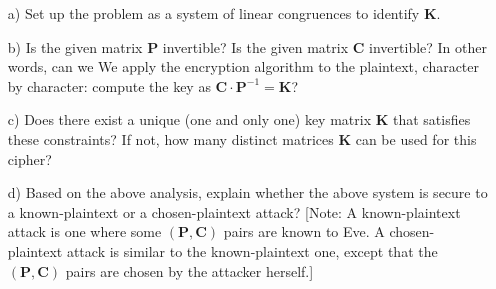 \documentclass[11pt]{article}
\begin{document}
\begin{itemize}
\item[a)] Set up the problem as a system of linear congruences to identify $\mathbf{K}$.\\
\item[b)]Is the given matrix $\mathbf{P}$ invertible? Is the given matrix $\mathbf{C}$ invertible? In other words, can we
We apply the encryption algorithm to the plaintext, character by character:
compute the key as $\mathbf{C} \cdot \mathbf{P}^{−1} = \mathbf{K}$? \\
\item[c)]  Does there exist a unique (one and only one) key matrix $\mathbf{K}$ that satisfies these constraints? If not, how many distinct matrices $\mathbf{K}$ can be used for this cipher?\\
\item[d)]  Based on the above analysis, explain whether the above system is secure to a known-plaintext or a chosen-plaintext attack? [Note: A known-plaintext attack is one where some $(\mathbf{P}, \mathbf{C})$ pairs are known to Eve. A chosen-plaintext attack is similar to the known-plaintext one, except that the $(\mathbf{P}, \mathbf{C})$ pairs are chosen by the attacker herself.] \\
\end{itemize}
\end{document}

